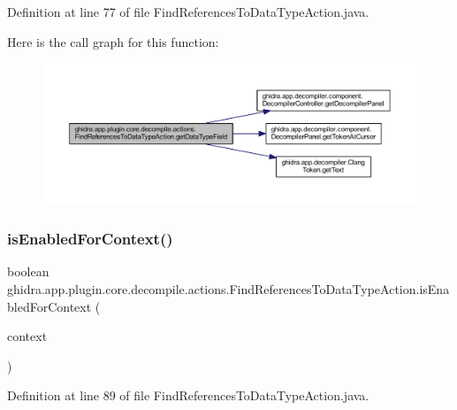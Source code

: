 Definition at line 77 of file Find\+References\+To\+Data\+Type\+Action.\+java.

Here is the call graph for this function\+:
\nopagebreak
\begin{figure}[H]
\begin{center}
\leavevmode
\includegraphics[width=350pt]{classghidra_1_1app_1_1plugin_1_1core_1_1decompile_1_1actions_1_1_find_references_to_data_type_action_ad65bcc7269c569b8cbfdc7c7355f6af9_cgraph}
\end{center}
\end{figure}
\mbox{\label{classghidra_1_1app_1_1plugin_1_1core_1_1decompile_1_1actions_1_1_find_references_to_data_type_action_a85d6965d0fd896bfb3b852a5e9ba2e86}} 
\subsubsection{\texorpdfstring{isEnabledForContext()}{isEnabledForContext()}}
{\footnotesize\ttfamily boolean ghidra.\+app.\+plugin.\+core.\+decompile.\+actions.\+Find\+References\+To\+Data\+Type\+Action.\+is\+Enabled\+For\+Context (\begin{DoxyParamCaption}\item[{Action\+Context}]{context }\end{DoxyParamCaption})\hspace{0.3cm}{\ttfamily [inline]}}



Definition at line 89 of file Find\+References\+To\+Data\+Type\+Action.\+java.

